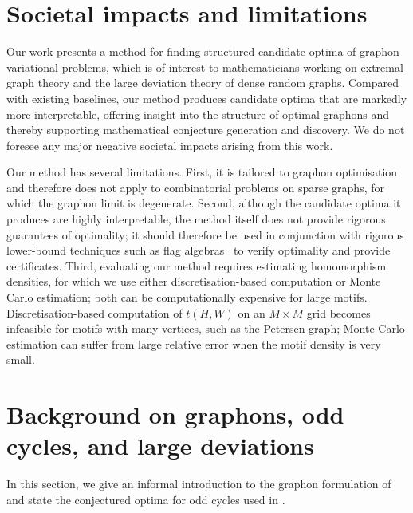 \documentclass{article}
\theoremstyle{plain}
\theoremstyle{definition}
\theoremstyle{remark}
\begin{document}
\section{Societal impacts and limitations}

Our work presents a method for finding structured candidate optima of graphon variational problems, which is of interest to mathematicians working on extremal graph theory and the large deviation theory of dense random graphs.
Compared with existing baselines, our method produces candidate optima that are markedly more interpretable, offering insight into the structure of optimal graphons and thereby supporting mathematical conjecture generation and discovery.
We do not foresee any major negative societal impacts arising from this work.

Our method has several limitations.
First, it is tailored to graphon optimisation and therefore does not apply to combinatorial problems on sparse graphs, for which the graphon limit is degenerate.
Second, although the candidate optima it produces are highly interpretable, the method itself does not provide rigorous guarantees of optimality; it should therefore be used in conjunction with rigorous lower-bound techniques such as flag algebras~\citep{razborov2007flag,falgas2013applications} to verify optimality and provide certificates.
Third, evaluating our method requires estimating homomorphism densities, for which we use either discretisation-based computation or Monte Carlo estimation; both can be computationally expensive for large motifs.
Discretisation-based computation of $t(H, W)$ on an $M \times M$ grid becomes infeasible for motifs with many vertices, such as the Petersen graph; Monte Carlo estimation can suffer from large relative error when the motif density is very small.


\section{Background on graphons, odd cycles, and large deviations}\label{sec:graphon-background}

In this section, we give an informal introduction to the graphon formulation of  and state the conjectured optima for odd cycles used in .
\end{document}
